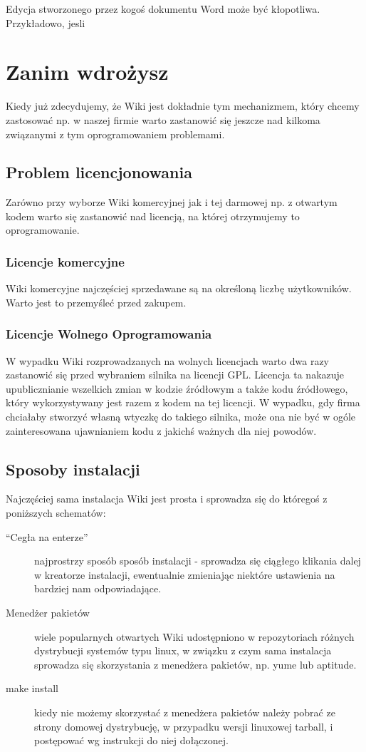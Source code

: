 \documentclass{article}
\begin{document}
Edycja stworzonego przez kogoś dokumentu Word może być kłopotliwa. Przykładowo, jesli 

\newpage
\section{Zanim wdrożysz}
Kiedy już zdecydujemy, że Wiki jest dokładnie tym mechanizmem, który chcemy zastosować np. w naszej firmie warto zastanowić się jeszcze nad kilkoma związanymi z tym oprogramowaniem problemami.
	\subsection{Problem licencjonowania}
	Zarówno przy wyborze Wiki komercyjnej jak i tej darmowej np. z otwartym kodem warto się zastanowić nad licencją, na której otrzymujemy to oprogramowanie.
	\subsubsection{Licencje komercyjne}
		Wiki komercyjne najczęściej sprzedawane są na określoną liczbę użytkowników. Warto jest to przemyśleć przed zakupem.  
	\subsubsection{Licencje Wolnego Oprogramowania}
		W wypadku Wiki rozprowadzanych na wolnych licencjach warto dwa razy zastanowić się przed wybraniem silnika na licencji GPL. Licencja ta nakazuje upublicznianie wszelkich zmian w kodzie źródłowym a także kodu źródłowego, który wykorzystywany jest razem z kodem na tej licencji. W wypadku, gdy firma chciałaby stworzyć własną wtyczkę do takiego silnika, może ona nie być w ogóle zainteresowana ujawnianiem kodu z jakichś ważnych dla niej powodów. 
	\subsection{Sposoby instalacji}
		Najczęściej sama instalacja Wiki jest prosta i sprowadza się do któregoś z poniższych schematów:		
		\begin{description}
		    \item[``Cegła na enterze''] najprostrzy sposób sposób instalacji - sprowadza się ciągłego klikania dalej w kreatorze instalacji, ewentualnie zmieniając niektóre ustawienia na bardziej nam odpowiadające.
			\item[Menedżer pakietów] wiele popularnych otwartych Wiki udostępniono w repozytoriach różnych dystrybucji systemów typu linux, w związku z czym sama instalacja sprowadza się skorzystania z menedżera pakietów, np. yume lub aptitude.
			\item[make install] kiedy nie możemy skorzystać z menedżera pakietów należy pobrać ze strony domowej dystrybucję, w przypadku wersji linuxowej tarball, i postępować wg instrukcji do niej dołączonej. 
 		\end{description}
\end{document}
